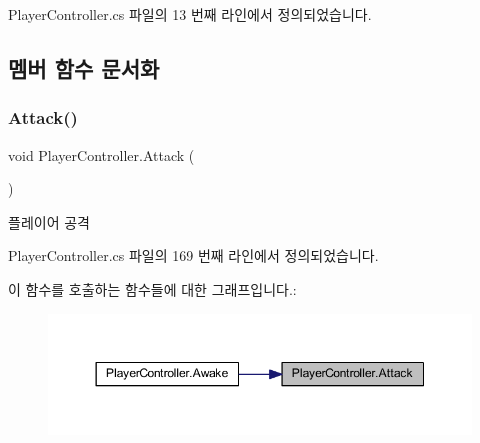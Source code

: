 Player\+Controller.\+cs 파일의 13 번째 라인에서 정의되었습니다.



\subsection{멤버 함수 문서화}
\mbox{\label{class_player_controller_a473a610cfe2a374d5cb39b3c44881d11}} 
\subsubsection{\texorpdfstring{Attack()}{Attack()}}
{\footnotesize\ttfamily void Player\+Controller.\+Attack (\begin{DoxyParamCaption}{ }\end{DoxyParamCaption})}



플레이어 공격 



Player\+Controller.\+cs 파일의 169 번째 라인에서 정의되었습니다.


\begin{DoxyCode}{0}

\end{DoxyCode}
이 함수를 호출하는 함수들에 대한 그래프입니다.\+:\nopagebreak
\begin{figure}[H]
\begin{center}
\leavevmode
\includegraphics[width=350pt]{dc/dde/class_player_controller_a473a610cfe2a374d5cb39b3c44881d11_icgraph}
\end{center}
\end{figure}
\mbox{\label{class_player_controller_a050967f0e5c2340cb21861e4c8c788a1}} 
